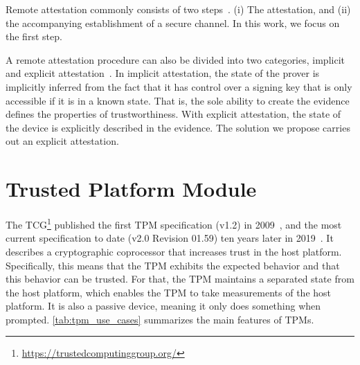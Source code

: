 Remote attestation commonly consists of two steps~\cite{McCune2008}.
(i) The attestation, and (ii) the accompanying establishment of a secure channel.
In this work, we focus on the first step.

A remote attestation procedure can also be divided into two categories, implicit and explicit attestation~\cite{dice-layering-arch}.
In implicit attestation, the state of the prover is implicitly inferred from the fact that it has control over a signing key that is only accessible if it is in a known state.
That is, the sole ability to create the evidence defines the properties of trustworthiness.
With explicit attestation, the state of the device is explicitly described in the evidence.
The solution we propose carries out an explicit attestation.

\section{Trusted Platform Module}\label{sec:tpm}

The \ac{TCG}\footnote{\url{https://trustedcomputinggroup.org/}} published the first TPM specification (v1.2) in 2009~\cite{ISO11889}, and the most current specification to date (v2.0 Revision 01.59) ten years later in 2019~\cite{tpm}.
It describes a cryptographic coprocessor that increases trust in the host platform.
Specifically, this means that the TPM exhibits the expected behavior and that this behavior can be trusted.
For that, the TPM maintains a separated state from the host platform, which enables the TPM to take measurements of the host platform.
It is also a passive device, meaning it only does something when prompted.
\autoref{tab:tpm_use_cases} summarizes the main features of TPMs.



